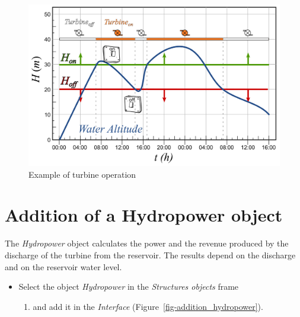 \documentclass[
  letterpaper,
  DIV=11,
  numbers=noendperiod]{scrreprt}
\providecommand{\tightlist}{%
  \setlength{\itemsep}{0pt}\setlength{\parskip}{0pt}}\usepackage{longtable,booktabs,array}
\begin{document}
\begin{figure}

{\centering \includegraphics{./figures/fig-example_turbine_operation.png}

}

\caption{\label{fig-example_turbine_operation}Example of turbine
operation}

\end{figure}

\hypertarget{addition-of-a-hydropower-object}{%
\section{Addition of a Hydropower
object}\label{addition-of-a-hydropower-object}}

The \emph{Hydropower} object calculates the power and the revenue
produced by the discharge of the turbine from the reservoir. The results
depend on the discharge and on the reservoir water level.

\begin{itemize}
\tightlist
\item
  Select the object \emph{Hydropower} in the \emph{Structures objects}
  frame

  \begin{enumerate}
  \def\labelenumi{(\arabic{enumi})}
  \setcounter{enumi}{1}
  \tightlist
  \item
    and add it in the \emph{Interface}
    (Figure~\ref{fig-addition_hydropower}).
  \end{enumerate}
\end{itemize}
\end{document}
